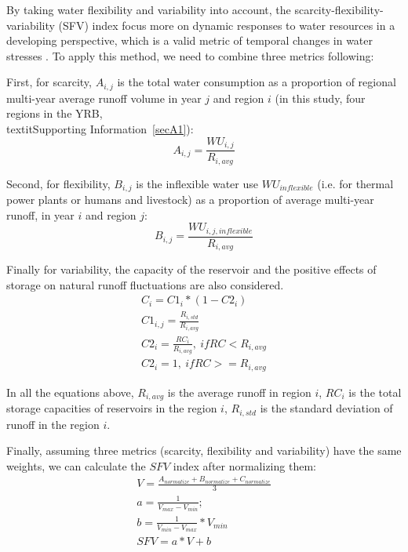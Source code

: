 By taking water flexibility and variability into account, the scarcity-flexibility-variability (SFV) index focus more on dynamic responses to water resources in a developing perspective, which is a valid metric of temporal changes in water stresses \cite{qin2019}. To apply this method, we need to combine three metrics following:

First, for scarcity, $A_{i, j}$ is the total water consumption as a proportion of regional multi-year average runoff volume in year $j$ and region $i$ (in this study, four regions in the YRB, \\textit{Supporting Information}~\ref{secA1}):
\begin{equation}
    A_{i, j} = \frac{WU_{i,j}}{R_{i, avg}}
\end{equation}

Second, for flexibility, $B_{i, j}$ is the inflexible water use $WU_{inflexible}$ (i.e. for thermal power plants or humans and livestock) as a proportion of average multi-year runoff, in year $i$ and region $j$:
\begin{equation}
    B_{i, j} = \frac{WU_{i, j, inflexible}}{R_{i, avg}}
\end{equation}

Finally for variability, the capacity of the reservoir and the positive effects of storage on natural runoff fluctuations are also considered.
\begin{gather}
C_i = C1_i * (1 - C2_i) \\
C1_{i, j} = \frac{R_{i, std}}{R_{i, avg}} \\
C2_{i} = \frac{RC_{i}}{R_{i, avg}}, \ if RC < R_{i, avg} \\
C2_{i} = 1, \ if RC >= R_{i, avg}
\end{gather}

In all the equations above, $R_{i, avg}$ is the average runoff in region $i$, $RC_i$ is the total storage capacities of reservoirs in the region $i$, $R_{i, std}$ is the standard deviation of runoff in the region $i$.

Finally, assuming three metrics (scarcity, flexibility and variability) have the same weights, we can calculate the $SFV$ index after normalizing them:
\begin{gather}
    V = \frac{A_{normalize} + B_{normalize} + C_{normalize}}{3}\\
    a = \frac{1}{V_{max} - V_{min}};\\
    b = \frac{1}{V_{min} - V_{max}} * V_{min}\\
    SFV = a * V + b
\end{gather}
